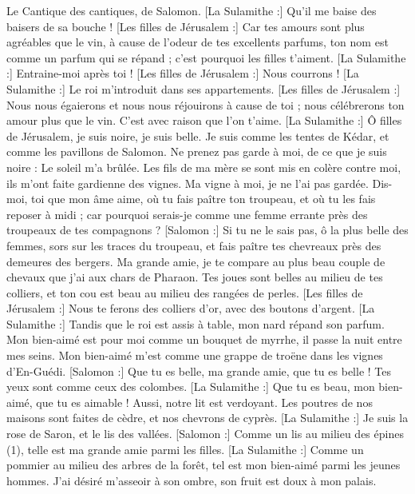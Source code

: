 \BFont
\begin{multicols}{2}
\VerseOne{}Le Cantique des cantiques, de Salomon.
[La Sulamithe :] Qu'il me baise des baisers de sa bouche ! [Les filles de Jérusalem :] Car tes amours sont plus agréables que le vin,
à cause de l'odeur de tes excellents parfums, ton nom est comme un parfum qui se répand ; c'est pourquoi les filles t'aiment.
[La Sulamithe :] Entraine-moi après toi ! [Les filles de Jérusalem :] Nous courrons ! [La Sulamithe :] Le roi m'introduit dans ses appartements. [Les filles de Jérusalem :] Nous nous égaierons et nous nous réjouirons à cause de toi ; nous célébrerons ton amour plus que le vin. C’est avec raison que l’on t’aime.
[La Sulamithe :] Ô filles de Jérusalem, je suis noire, je suis belle. Je suis comme les tentes de Kédar, et comme les pavillons de Salomon.
Ne prenez pas garde à moi, de ce que je suis noire : Le soleil m'a brûlée. Les fils de ma mère se sont mis en colère contre moi, ils m'ont faite gardienne des vignes. Ma vigne à moi, je ne l’ai pas gardée.
Dis-moi, toi que mon âme aime, où tu fais paître ton troupeau, et où tu les fais reposer à midi ; car pourquoi serais-je comme une femme errante près des troupeaux de tes compagnons ?
[Salomon :] Si tu ne le sais pas, ô la plus belle des femmes, sors sur les traces du troupeau, et fais paître tes chevreaux près des demeures des bergers.
Ma grande amie, je te compare au plus beau couple de chevaux que j'ai aux chars de Pharaon.
Tes joues sont belles au milieu de tes colliers, et ton cou est beau au milieu des rangées de perles.
[Les filles de Jérusalem :] Nous te ferons des colliers d'or, avec des boutons d'argent.
[La Sulamithe :] Tandis que le roi est assis à table, mon nard répand son parfum.
Mon bien-aimé est pour moi comme un bouquet de myrrhe, il passe la nuit entre mes seins.
Mon bien-aimé m'est comme une grappe de troëne dans les vignes d'En-Guédi.
[Salomon :] Que tu es belle, ma grande amie, que tu es belle ! Tes yeux sont comme ceux des colombes.
[La Sulamithe :] Que tu es beau, mon bien-aimé, que tu es aimable ! Aussi, notre lit est verdoyant.
Les poutres de nos maisons sont faites de cèdre, et nos chevrons de cyprès.
\VerseOne{}[La Sulamithe :] Je suis la rose de Saron, et le lis des vallées.
[Salomon :] Comme un lis au milieu des épines (1), telle est ma grande amie parmi les filles.
[La Sulamithe :] Comme un pommier au milieu des arbres de la forêt, tel est mon bien-aimé parmi les jeunes hommes. J'ai désiré m’asseoir à son ombre, son fruit est doux à mon palais.

\end{multicols}
